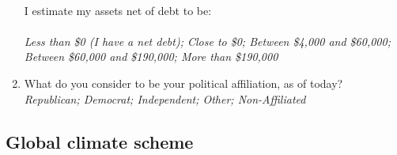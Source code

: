 \begin{enumerate}[resume]
  \\
  I estimate my assets net of debt to be: \\%
\\  \textit{Less than \$0 (I have a net debt); Close to \$0; Between \$4,000 and \$60,000; Between \$60,000 and \$190,000; More than \$190,000}
\item What do you consider to be your political affiliation, as of today?
\\ \textit{Republican; Democrat; Independent; Other; Non-Affiliated}
\end{enumerate}

\subsection*{Global climate scheme}

